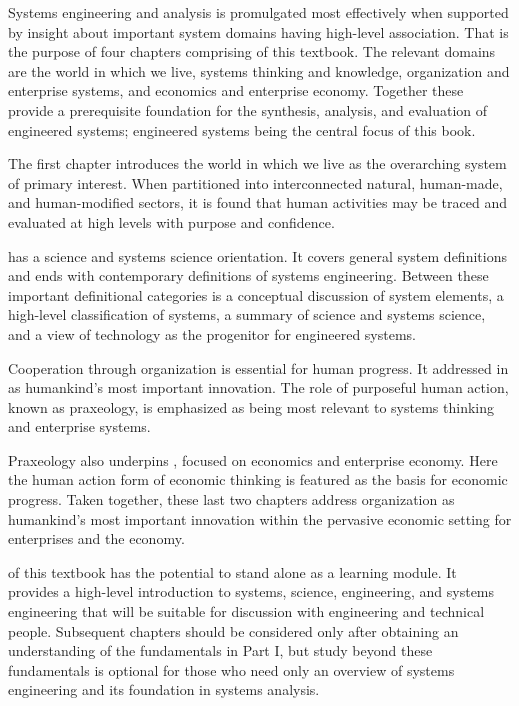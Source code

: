 Systems engineering and analysis is promulgated most effectively when supported by insight about important system domains having high-level association.  That is the purpose of four chapters comprising  of this textbook.  The relevant domains are the world in which we live, systems thinking and knowledge, organization and enterprise systems, and economics and enterprise economy. Together these provide a prerequisite foundation for the synthesis, analysis, and evaluation of engineered systems; engineered systems being the central focus of this book.
	
The first chapter introduces the world in which we live as the overarching system of primary interest. When partitioned into interconnected natural, human-made, and human-modified sectors, it is found that human activities may be traced and evaluated at high levels with purpose and confidence.
	
 has a science and systems science orientation.  It covers general system definitions and ends with contemporary definitions of systems engineering.  Between these important definitional categories is a conceptual discussion of system elements, a high-level classification of systems, a summary of science and systems science, and a view of technology as the progenitor for engineered systems.
	
Cooperation through organization is essential for human progress. It addressed in  as humankind’s most important innovation. The role of purposeful human action, known as praxeology, is emphasized as being most relevant to systems thinking and enterprise systems.
	
Praxeology also underpins , focused on economics and enterprise economy.  Here the human action form of economic thinking is featured as the basis for economic progress. Taken together, these last two chapters address organization as humankind’s most important innovation within the pervasive economic setting for enterprises and the economy.

 of this textbook has the potential to stand alone as a learning module.  It provides a high-level introduction to systems, science, engineering, and systems engineering that will be suitable for discussion with engineering and technical people.  Subsequent chapters should be considered only after obtaining an understanding of the fundamentals in Part I, but study beyond these fundamentals is optional for those who need only an overview of systems engineering and its foundation in systems analysis.